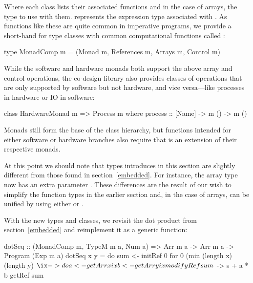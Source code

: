 \documentclass[../paper.tex]{subfiles}
\begin{document}
\noindent Where each class lists their associated functions and in the case of arrays, the type to use with them.  represents the expression type associated with . As functions like these are quite common in imperative programs, we provide a short-hand for type classes with common computational functions called :

\begin{code}
type MonadComp m = (Monad m, References m, Arrays m, Control m)
\end{code}


While the software and hardware monads both support the above array and control operations, the co-design library also provides classes of operations that are only supported by software but not hardware, and vice versa---like processes in hardware or IO in software:

\begin{code}
class HardwareMonad m => Process m where
  process :: [Name] -> m () -> m ()
\end{code}

\noindent Monads still form the base of the class hierarchy, but functions intended for either software or hardware branches also require that  is an extension of their respective monads.

At this point we should note that types introduces in this section are slightly different from those found in section~\ref{embedded}. For instance, the array type now has an extra parameter . These differences are the result of our wish to simplify the function types in the earlier section and, in the case of arrays, can be unified by using either  or .

With the new types and classes, we revisit the dot product from section~\ref{embedded} and reimplement it as a generic function:

\begin{code}
dotSeq :: (MonadComp m, TypeM m a, Num a) =>
  Arr m a -> Arr m a -> Program (Exp m a)
dotSeq x y = do
  sum <- initRef 0
  for 0 (min (length x) (length y) $ \ix -> do
    a <- getArr x ix
    b <- getArr y ix
    modifyRef sum $ \s -> s + a * b
  getRef sum
\end{code}
\end{document}
